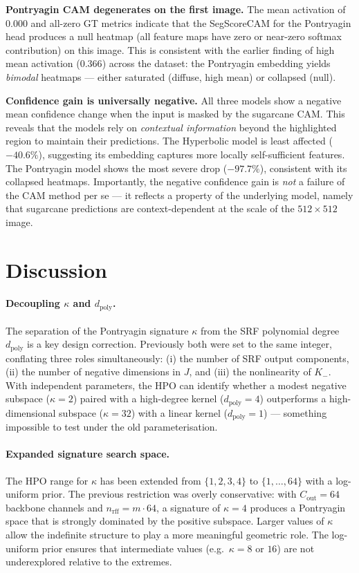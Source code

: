 \documentclass[12pt,a4paper]{article}
\newcommand{\kap}{\kappa}
\newcommand{\dpoly}{d_{\mathrm{poly}}}
\theoremstyle{definition}
\begin{document}
\textbf{Pontryagin CAM degenerates on the first image.}
The mean activation of $0.000$ and all-zero GT metrics indicate that the
SegScoreCAM for the Pontryagin head produces a null heatmap (all feature
maps have zero or near-zero softmax contribution) on this image.  This is
consistent with the earlier finding of high mean activation ($0.366$)
across the dataset: the Pontryagin embedding yields \emph{bimodal}
heatmaps — either saturated (diffuse, high mean) or collapsed (null).

\textbf{Confidence gain is universally negative.}
All three models show a negative mean confidence change when the input is
masked by the sugarcane CAM.  This reveals that the models rely on
\emph{contextual information} beyond the highlighted region to maintain
their predictions.  The Hyperbolic model is least affected ($-40.6\%$),
suggesting its embedding captures more locally self-sufficient features.
The Pontryagin model shows the most severe drop ($-97.7\%$), consistent
with its collapsed heatmaps.  Importantly, the negative confidence gain is
\emph{not} a failure of the CAM method per se — it reflects a property
of the underlying model, namely that sugarcane predictions are
context-dependent at the scale of the $512 \times 512$ image.

\section{Discussion}

\paragraph{Decoupling $\kap$ and $\dpoly$.}
The separation of the Pontryagin signature $\kap$ from the SRF polynomial
degree $\dpoly$ is a key design correction.  Previously both were set to the
same integer, conflating three roles simultaneously: (i) the number of SRF
output components, (ii) the number of negative dimensions in $J$, and (iii)
the nonlinearity of $K_-$.  With independent parameters, the HPO can
identify whether a modest negative subspace ($\kap = 2$) paired with a
high-degree kernel ($\dpoly = 4$) outperforms a high-dimensional subspace
($\kap = 32$) with a linear kernel ($\dpoly = 1$) — something impossible to
test under the old parameterisation.

\paragraph{Expanded signature search space.}
The HPO range for $\kap$ has been extended from $\{1,2,3,4\}$ to
$\{1,\ldots,64\}$ with a log-uniform prior.  The previous restriction was
overly conservative: with $C_{\text{out}} = 64$ backbone channels and
$n_{\text{rff}} = m \cdot 64$, a signature of $\kap = 4$ produces a
Pontryagin space that is strongly dominated by the positive subspace.
Larger values of $\kap$ allow the indefinite structure to play a more
meaningful geometric role.  The log-uniform prior ensures that intermediate
values (e.g.\ $\kap = 8$ or $16$) are not underexplored relative to the
extremes.
\end{document}
